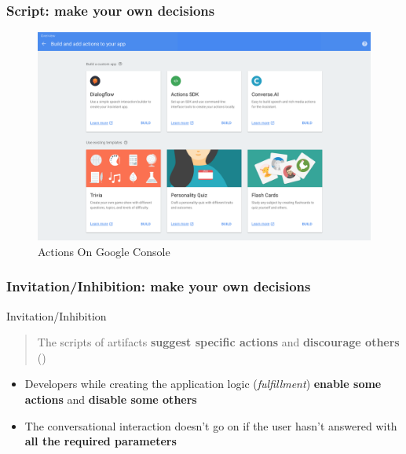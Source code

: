 \documentclass{beamer}
\begin{document}
\begin{frame}
\frametitle{Script: make your own decisions}
\begin{figure}
	\centering
	\includegraphics[width=1\linewidth]{images/script_image}
	\caption[actions_google]{Actions On Google Console}
	\label{fig:scriptimage}
\end{figure}

\end{frame}

\begin{frame}
\frametitle{Invitation/Inhibition: make your own decisions}

\begin{block}{Invitation/Inhibition} 
	\begin{quote}
		The scripts of artifacts \textbf{suggest specific actions} and \textbf{discourage others} (\cite{verbeek2011moralizing})
	\end{quote}

\begin{itemize}
	\item Developers while creating the application logic (\emph{fulfillment}) \textbf{enable some actions} and \textbf{disable some others}
	\item The conversational interaction doesn't go on if the user hasn't answered with \textbf{all the required parameters}
\end{itemize}

\end{block}

\end{frame}
\end{document}
